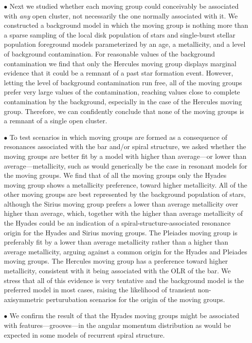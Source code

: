 $\bullet$ Next we studied whether each moving group could conceivably
be associated with \emph{any} open cluster, not necessarily the one
normally associated with it. We constructed a background model in
which the moving group is nothing more than a sparse sampling of the
local disk population of stars and single-burst stellar population
foreground models parameterized by an age, a metallicity, and a level
of background contamination. For reasonable values of the background
contamination we find that only the Hercules moving group displays
marginal evidence that it could be a remnant of a past star formation
event. However, letting the level of background contamination run
free, all of the moving groups prefer very large values of the
contamination, reaching values close to complete contamination by the
background, especially in the case of the Hercules moving
group. Therefore, we can confidently conclude that none of the moving
groups is a remnant of a single open cluster.

$\bullet$ To test scenarios in which moving groups are formed as a
consequence of resonances associated with the bar and/or spiral
structure, we asked whether the moving groups are better fit by a
model with higher than average---or lower than average---metallicity,
such as would generically be the case in resonant models for the
moving groups. We find that of all the moving groups only the Hyades
moving group shows a metallicity preference, toward higher
metallicity. All of the other moving groups are best represented by
the background population of stars, although the Sirius moving group
prefers a lower than average metallicity over higher than average,
which, together with the higher than average metallicity of the Hyades
could be an indication of a spiral-structure-associated resonance
origin for the Hyades and Sirius moving groups. The Pleiades moving
group is preferably fit by a lower than average metallicity rather
than a higher than average metallicity, arguing against a common
origin for the Hyades and Pleiades moving groups. The Hercules moving
group has a preference toward higher metallicity, consistent with it
being associated with the OLR of the bar. We stress that all of this
evidence is very tentative and the background model is the preferred
model in most cases, raising the likelihood of transient
non-axisymmetric perturubation scenarios for the origin of the moving
groups.

$\bullet$ We confirm the result of \citet{sellwood10a} that the Hyades
moving groups might be associated with features---grooves---in the
angular momentum distribution as would be expected in some models of
recurrent spiral structure.



